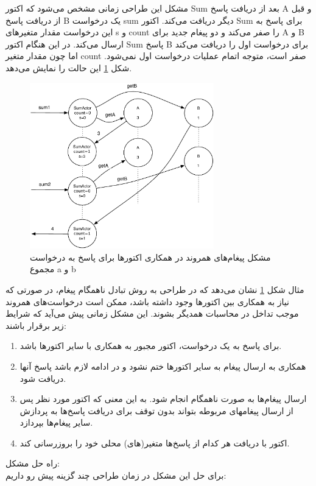 مشکل این طراحی زمانی مشخص می‌شود که اکتور Sum بعد از دریافت پاسخ‌ A و قبل از دریافت پاسخ B یک درخواست sum دیگر دریافت می‌کند. اکتور Sum برای پاسخ به این درخواست مقدار متغیرهای s و count را صفر می‌کند و دو پیغام جدید برای A و B ارسال می‌کند. در این هنگام اکتور Sum پاسخ B برای درخواست اول را دریافت می‌کند اما چون مقدار متغیر count صفر است، متوجه اتمام عملیات درخواست اول نمی‌شود. شکل \ref{fig:coord2} این حالت را نمایش می‌دهد.
\begin{figure}[h]
    \begin{center}
	\includegraphics[width=8cm]{4-ProposedFramework/Figures/ExampleCoord2.pdf}
    \end{center}
    \caption{\label{fig:coord2} مشکل پیغام‌های همروند در همکاری اکتورها برای پاسخ به درخواست مجموع a و b}
\end{figure}
مثال شکل \ref{fig:coord2} نشان می‌دهد که در طراحی به روش تبادل ناهمگام پیغام، در صورتی که نیاز به همکاری بین اکتورها وجود داشته باشد، ممکن است درخواست‌های همروند موجب تداخل در محاسبات همدیگر بشوند. این مشکل زمانی پیش می‌آید که شرایط زیر برقرار باشند:\\
 \begin{enumerate}
 \item برای پاسخ به یک درخواست، اکتور مجبور به همکاری با سایر اکتورها باشد.
 \item همکاری به ارسال پیغام به سایر اکتورها ختم نشود و در ادامه لازم باشد پاسخ آنها دریافت شود. 
 \item ارسال پیغام‌ها به صورت ناهمگام انجام شود. به این معنی که اکتور مورد نظر پس از ارسال پیغامهای مربوطه بتواند بدون توقف برای دریافت پاسخ‌ها به پردازش سایر پیغام‌ها بپردازد.
 \item اکتور با دریافت هر کدام از پاسخ‌ها متغیر(های) محلی خود را بروزرسانی کند.
 \end{enumerate}
راه حل مشکل:\\
برای حل این مشکل در زمان طراحی چند گزینه پیش رو داریم:
